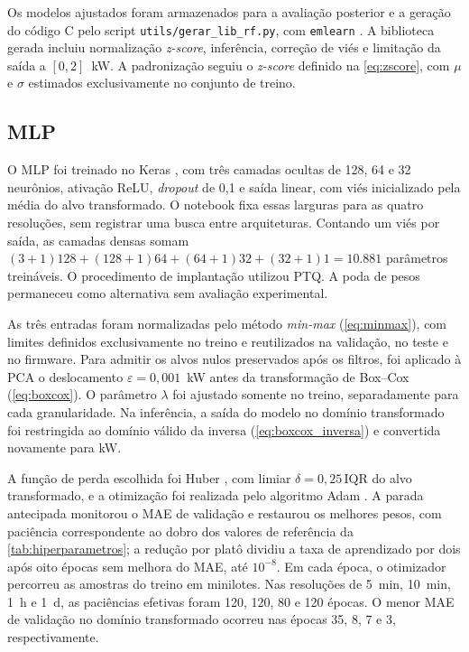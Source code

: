 Os modelos ajustados foram armazenados para a avaliação posterior e a
geração do código C pelo script \texttt{utils/gerar\_lib\_rf.py}, com
\texttt{emlearn} \cite{emlearn2024}. A biblioteca gerada incluiu
normalização \textit{z-score}, inferência, correção de viés e limitação da
saída a $[0,2]$~kW. A padronização seguiu o \textit{z-score} definido na
\cref{eq:zscore}, com $\mu$ e $\sigma$ estimados exclusivamente no
conjunto de treino.
\subsection{MLP}

O MLP foi treinado no Keras \cite{chollet2015}, com três camadas ocultas de
128, 64 e 32 neurônios, ativação ReLU, \textit{dropout} de 0,1 e saída
linear, com viés inicializado pela média do alvo transformado. O notebook
fixa essas larguras para as quatro resoluções, sem registrar uma busca entre
arquiteturas. Contando um viés por saída, as camadas densas somam
$(3+1)128+(128+1)64+(64+1)32+(32+1)1=10.881$ parâmetros treináveis. O
procedimento de implantação utilizou PTQ. A poda de pesos permaneceu como
alternativa sem avaliação experimental.

As três entradas foram normalizadas pelo método \textit{min-max}
(\cref{eq:minmax}), com limites definidos exclusivamente no treino e
reutilizados na validação, no teste e no firmware. Para admitir os alvos
nulos preservados após os filtros, foi aplicado à PCA o deslocamento
$\varepsilon=0{,}001$~kW antes da transformação de Box--Cox
(\cref{eq:boxcox}). O parâmetro $\lambda$ foi ajustado somente no treino,
separadamente para cada granularidade. Na inferência, a saída do modelo no
domínio transformado foi restringida ao domínio válido da inversa
(\cref{eq:boxcox_inversa}) e convertida novamente para kW.

A função de perda escolhida foi Huber \cite{huber1964}, com limiar
$\delta=0{,}25\,\mathrm{IQR}$ do alvo transformado, e a otimização foi
realizada pelo algoritmo Adam \cite{kingma2015}. A parada antecipada
monitorou o MAE de validação e restaurou os melhores pesos, com paciência
correspondente ao dobro dos valores de referência da
\cref{tab:hiperparametros}; a redução por platô dividiu a taxa de
aprendizado por dois após oito épocas sem melhora do MAE, até $10^{-8}$. Em
cada época, o otimizador percorreu as amostras do treino em minilotes. Nas
resoluções de 5~min, 10~min, 1~h e 1~d, as paciências efetivas foram 120,
120, 80 e 120 épocas. O menor MAE de validação no domínio transformado
ocorreu nas épocas 35, 8, 7 e 3, respectivamente.

